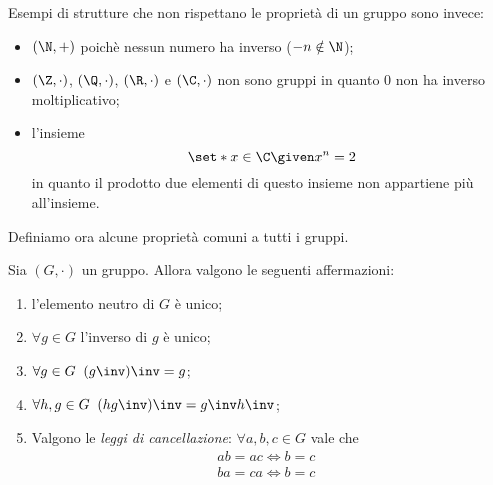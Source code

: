 Esempi di strutture che non rispettano le proprietà di un gruppo sono invece:
\begin{itemize}
    \item $(\N, +)$ poichè nessun numero ha inverso ($-n \notin \N$);
    \item $(\Z, \cdot)$, $(\Q, \cdot)$, $(\R, \cdot)$ e $(\C, \cdot)$ non sono gruppi in quanto $0$ non ha inverso moltiplicativo;
    \item l'insieme \[
        \set*{x \in \C \given x^n = 2}    
    \] in quanto il prodotto due elementi di questo insieme non appartiene più all'insieme.
\end{itemize}

Definiamo ora alcune proprietà comuni a tutti i gruppi.

\begin{proposition}
     \label{prop:prop_grp}
    Sia $(G, \cdot)$ un gruppo. Allora valgono le seguenti affermazioni:
    \begin{enumerate}[label={(\roman*)}, ref={\theproposition: (\roman*)}]
        \item \label{prop:prop_grp:e_unico} l'elemento neutro di $G$ è unico;\
        \item \label{prop:prop_grp:inv_unico} $\forall g \in G$ l'inverso di $g$ è unico;
        \item \label{prop:prop_grp:inv_inv} $\forall g \in G \;\; (g\inv)\inv = g$;
        \item \label{prop:prop_grp:inv_prod} $\forall h, g \in G \;\; (hg\inv)\inv = g\inv h\inv$; 
        \item \label{prop:prop_grp:canc} Valgono le \emph{leggi di cancellazione}: $\forall a, b, c \in G$ vale che \begin{align}
            ab = ac \iff b = c &\tag{sx} \label{prop:prop_grp:canc:sx}\\
            ba = ca \iff b = c &\tag{dx} \label{prop:prop_grp:canc:dx}
        \end{align}
    \end{enumerate}
\end{proposition}
